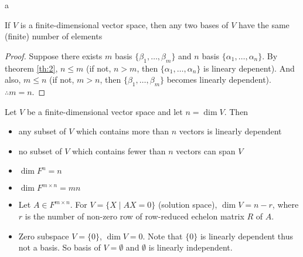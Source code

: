\documentclass[8pt]{beamer}
\begin{document}
\begin{frame}{a}
    \begin{corollary}
        If $V$ is a finite-dimensional vector space, then any two bases of $V$ have the same (finite) number of elements
    \end{corollary}
    \begin{proof}
            Suppose there exists $m$ basis $\{\beta_1, \dots, \beta_m\}$ and $n$ basis $\{\alpha_1, \dots, \alpha_n\}$. By theorem \ref{th:2}, $n \leq m$ (if not, $n > m$, then $\{\alpha_1, \dots, \alpha_n\}$ is lineary depenent). And also, $m \leq n$ (if not, $m > n$, then $\{\beta_1, \dots, \beta_m\}$ becomes linearly dependent).
            $\therefore m=n$.
    \end{proof}

    \begin{corollary}
        Let $V$ be a finite-dimensional vector space and let $n = \dim{V}$. Then
        \begin{itemize}
            \item any subset of $V$ which contains more than $n$ vectors is linearly dependent
            \item no subset of $V$ which contains fewer than $n$ vectors can span $V$
        \end{itemize}
    \end{corollary}

    \begin{example}
        \begin{itemize}
            \item $\dim{F^n} = n$
            \item $\dim{F^{m \times n}} = mn$
            \item Let $A \in F^{m \times n}$. For $V=\{X\mid AX =0\}$ (solution space), $\dim{V} = n - r$, where $r$ is the number of non-zero row of row-reduced echelon matrix $R$ of $A$.
            \item Zero subspace $V = \{0\}$, $\dim{V} = 0$. Note that $\{0\}$ is linearly dependent thus not a basis. So basis of $V = \emptyset$ and $\emptyset$ is linearly independent.
        \end{itemize}
    \end{example}
\end{frame}
\end{document}
